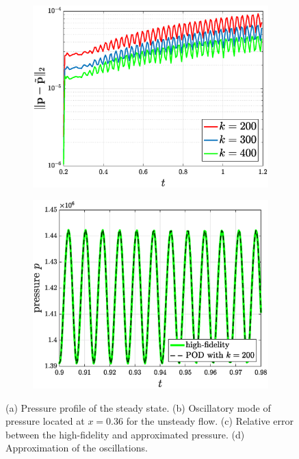 \begin{figure}[t]
\begin{subfigure}[]{0.47\linewidth}
	\includegraphics[width=\textwidth]{./pic/p_error}
	\caption{} \label{fig:5p2.2c}
\end{subfigure}
\begin{subfigure}[]{0.47\linewidth}
	\includegraphics[width=\textwidth]{./pic/rom_freq}
	\caption{} \label{fig:5p2.2d}
\end{subfigure}
\caption{(a) Pressure profile of the steady state. (b) Oscillatory mode of pressure located at $x=0.36$ for the unsteady flow. (c) Relative error between the high-fidelity and approximated pressure. (d) Approximation of the oscillations. }
\label{fig:5p2.2}
\end{figure}

